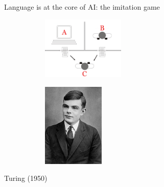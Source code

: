 \documentclass[usenames,dvipsnames,notes,11pt,aspectratio=169]{beamer}
\newcommand{\pdfnote}[1]{}
\begin{document}
\begin{frame}
    {Language is at the core of AI: the imitation game}
    \begin{figure}
        \begin{subfigure}[b]{0.4\textwidth}
        \includegraphics[height=3cm]{figures/turing-test}
        \end{subfigure}\hfill
        \begin{subfigure}[b]{0.4\textwidth}
        \includegraphics[height=4cm]{figures/turing}
        \end{subfigure}
    \end{figure}
    \pdfnote{The interrogator chats with two agents and must tell which is human vs AI.}

     Turing (1950)
    \pdfnote{Alan Turing proposed the famous Turing test as a criteria for intelligence, where an interrogator tries to distinguish between a computer and a real human through text-based conversation. Turing was optimistic that a machine will pass the Turing test by the end of the century and possess human thinking capability. We are obviously far from that. But a more interesting question is, even if a machine passes the Turing test, does it mean it has acquired human intelligence?}

    \pause\medskip
    \pdfnote{You can have a not so smart AI which an fake humanlikeness, or a superhuman AI that can be detected by the interrogator.}
    \pdfnote{In practice, evaluating AI is a challenging task, moving goal post, test coverage etc.}
\end{frame}
\end{document}
